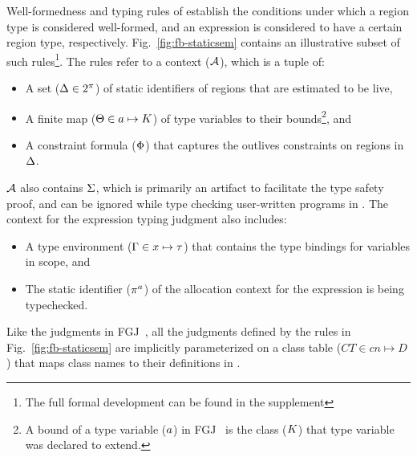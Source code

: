 Well-formedness and typing rules of \fbname establish the conditions
under which a region type is considered well-formed, and an expression
is considered to have a certain region type, respectively.
Fig.~\ref{fig:fb-staticsem} contains an illustrative subset of such
rules\footnote{The full formal development can be found in the
supplement}. The rules refer to a context (${\mathcal{A}}$), which is a tuple of:
\begin{itemize}
\item A set ($\Delta \in 2^\pi$) of static identifiers of regions
that are estimated to be live,
\item A finite map ($\Theta \in a \mapsto K$) of type
variables to their bounds\footnote{A bound of a type variable
($a$) in FGJ~\cite{fgj} is the class ($K$) that type variable
was declared to extend.}, and
\item A constraint formula ($\Phi$) that captures the outlives
constraints on regions in $\Delta$.
\end{itemize}
${\mathcal{A}}$ also contains $\Sigma$, 
which is primarily an artifact to facilitate the type safety proof,
and can be ignored while type checking user-written programs
in \FB. The context for the expression typing judgment also includes:
\begin{itemize}
\item A type environment ($\Gamma \in x \mapsto \tau$) that contains the
type bindings for variables in scope, and 
\item The static identifier ($\pi^a$) of the allocation context for
the expression is being typechecked.  
\end{itemize}
Like the judgments in FGJ~\cite{fgj}, all the judgments defined by the
rules in Fig.~\ref{fig:fb-staticsem} are implicitly parameterized on a
class table ($CT \in cn \mapsto D$) that maps class names to their
definitions in \FB.

